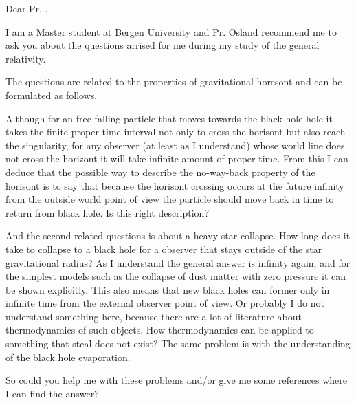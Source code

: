 \documentclass{letter}
\begin{document}
Dear Pr. ,

I am a Master student at Bergen University and Pr. Osland recommend me to
ask you about the questions arrised for me during my study of the general 
relativity.

The questions are related to the properties of gravitational horesont
and can be formulated as follows. 

Although for an free-falling particle that moves towards the black hole hole
it takes the finite proper time interval not only to cross the horisont but 
also reach the singularity, for any observer (at least as I understand)
whose world line does not cross the horizont it will take infinite amount
of proper time. From this I can deduce that the possible way to describe the 
no-way-back property of the horisont is to say that because the horisont
crossing occurs  at the future infinity from the outside world point 
of view the particle should move back in time to return from black hole.
Is this right description?

And the second related questions is about a heavy star collapse.
How long does it take to collapse to a black hole for 
a observer that stays outside of the star gravitational radius?
As I understand the general answer is infinity again, and for the simplest 
models such as the collapse of dust matter with zero pressure
it can be shown explicitly. This also means that new black holes can former
only in infinite time from the external observer point of view. Or probably
I do not understand something here, because there are a lot of literature about
thermodynamics of such objects. How thermodynamics can be 
applied to something that steal does not exist? The same problem is with the 
understanding of the black hole evaporation. 

So could you help me with these problems and/or give me some references where
I can find the answer?
\end{document}
